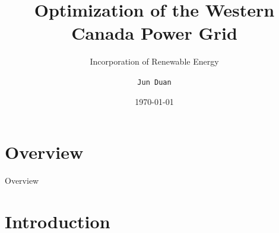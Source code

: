 \documentclass[newPxFont,numfooter,progressbar,sectionpages]{beamer}
\title[Incorporation of Renewable Energy]{Optimization of the Western Canada Power Grid}
\subtitle{Incorporation of Renewable Energy}
\date{\today}
\author{\texttt{Jun Duan}}
\begin{document}
%
%

\maketitle







%
%

\section*{Overview}
\begin{frame}{Overview}
\tableofcontents
\end{frame}

%
%

\section{Introduction}

\end{document}
